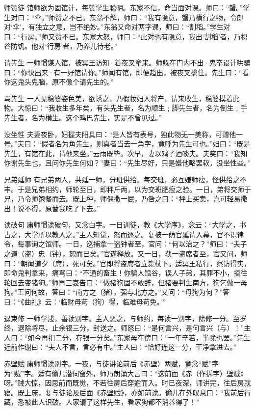 \documentclass[12pt,UTF8]{ctexbook}
\begin{document}
师赞徒
馆师欲为固馆计，每赞学生聪明。东家不信，命当面对课。师曰：“蟹。”学生对曰：“伞。”师赞之不已。东翁不解，师曰：“我有隐意，蟹乃横行之物，令郎对‘伞’，有独立之意，岂不绝妙。”东翁又命对两字课，师曰：“割稻。”学生对曰：“行房。”师又赞不已。东家大怒，师曰：“此对也有隐意，我出‘割稻’者，乃积谷防饥。他对‘行房’者，乃养儿待老。”

请先生
一师惯谋人馆，被冥王访知·着夜叉拿来。师躲在门内不出·鬼卒设计哄骗曰：“你快出来·有一好馆请你。”师闻有馆，即便趋出，被夜叉擒住。先生曰：“看你这鬼头鬼脑，原不像个请先生的。”

骂先生
一人见稳婆姿色美，欲诱之，乃假妆妇人将产，请来收生，稳婆摸着此物。大惊曰：“我收生多年矣，有头先生者，名为顺生﹔脚先生者，名为倒生﹔手先生者，名为横生。这个鸡巴先生，实是不曾见过。”

没坐性
夫妻夜卧，妇握夫阳具曰：“是人皆有表号，独此物无一美称，可赠他一号。”夫曰：“假者名为角先生，则真者当去一角字，竟呼为先生可也。”妇曰：“既是先生，有馆在此，请他来坐。”云雨既毕。次早，妻以鸡子酒啖夫。夫笑曰：“我知你谢先生也，且问你先生何如？”妻曰：“先生尽好，只是嫌他略罢软，没坐性些。”

兄弟延师
有兄弟两人，共延一师，分班供给。每交班，必互嫌师瘦，怪供给之不丰。于是兄弟相约，师轮至日，即秤斤两，以为交班肥瘦之验。一日，弟将交师于兄，乃令师饱餐而去。既上秤，师偶撒一屁，乃咎之曰：“秤上买卖，岂可轻易撒出！说不得，原替我吃了下去。”

读破句
庸师惯读破句，又念白字。一日训徒，教《大学序》，念云：“大学之，书古之，大学所以教人之。”主人知觉，怒而逐之。复被一荫官延请入幕，官不识律令，每事询之馆师。一日，巡捕拿一盗钟者至，官问：“何以治之？”师曰：“夫子之道（盗）忠（钟），恕而已矣。”官遂释放。又一日，获一盗席者至，官又问，师曰：“朝闻道夕（席），死可矣。”官即将盗席者立毙杖下。适冥王私行，察访得实，即命鬼判拿来，痛骂曰：“不通的畜生！你骗人馆谷，误人子弟，其罪不小，摘往轮回去变猪狗。”师再三哀告曰：“做猪狗固不敢辞，但猪要判生南方，狗乞做一母狗。”王问何故，答曰：“南方之（猪），强与北方之。”又问：“母狗为何？”答曰：“《曲礼》云：‘临财母苟（狗）得，临难母苟免。’”

退束修
一师学浅，善读别字。主人恶之，与师约，每读一别字，除修一分。至岁终，退除将尽，止余银三分，封送之。师怒曰：“是何言兴，是何言兴（与）！”主人曰：“如今再扣二分，存银一分矣。”东家母在傍曰：“一年辛若，半除也罢。”先生近前作谢曰：“夫人不言，言必有中。”主人曰：“恰好连这一分，干净拿进去。”

赤壁赋
庸师惯读别字。一夜，与徒讲论前后《赤壁）两赋，竟念“赋”字为“贼”字。适有偷儿潜伺窗外，师乃朗诵大言曰：“这前面《赤（作拆字）壁贼》呀。”贼大惊，因思前而既觉，不若往房后穿逾而入。时已夜深，师讲完，往后房就寝。既上床，复与徒论及后面《赤壁赋》，亦如前读。偷儿在外叹息曰：“我前后行藏，悉被此人识破。人家请了这样先生，看家狗都不消养得了！”
\end{document}

